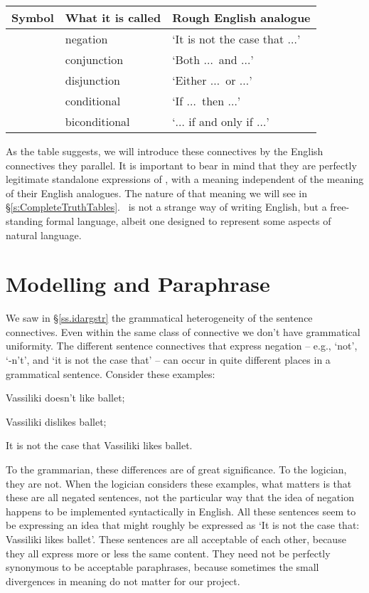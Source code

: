 	\begin{table}[h]
	\center
	\begin{tabular}{l l l} \toprule 
	
	\textbf{Symbol}&\textbf{What it is called}&\textbf{Rough English analogue}\\
	\midrule
	\enot&negation&`It is not the case that $…$'\\
	\eand&conjunction&`Both $…$\ and $…$'\\
	\eor&disjunction&`Either $…$\ or $…$'\\
	\eif&conditional&`If $…$\ then $…$'\\
	\eiff&biconditional&`$…$ if and only if $…$'\\
	
	\bottomrule \end{tabular}
	\end{table}

As the table suggests, we will introduce these connectives by the English connectives they parallel. It is important to bear in mind that they are perfectly legitimate standalone expressions of \TFL, with a meaning independent of the meaning of their English analogues. The nature of that meaning we will see in §\ref{s:CompleteTruthTables}. \TFL\ is not a strange way of writing English, but a free-standing formal language, albeit one designed to represent some aspects of natural language.

\section{Modelling and Paraphrase} %
\label{sec:modelling_and_paraphrase}

We saw in §\ref{ss.idargstr} the grammatical heterogeneity of the sentence connectives. Even within the same class of connective we don't have grammatical uniformity. The different sentence connectives that express negation – e.g., `not', `-n't', and `it is not the case that' – can occur in quite different places in a grammatical sentence. Consider these examples:
 \begin{earg}
	\item Vassiliki doesn’t like ballet;
	\item Vassiliki dislikes ballet;
	\item It is not the case that Vassiliki likes ballet.
\end{earg} To the grammarian, these differences are of great significance. To the logician, they are not. When the logician considers these examples, what matters is that these are all negated sentences, not the particular way that the idea of negation happens to be implemented syntactically in English. All these sentences seem to be expressing an idea that might roughly be expressed as `It is not the case that: Vassiliki likes ballet'. These sentences are all acceptable  of each other, because they all express more or less the same content. They need not be perfectly synonymous to be acceptable paraphrases, because sometimes the small divergences in meaning do not matter for our project. 

